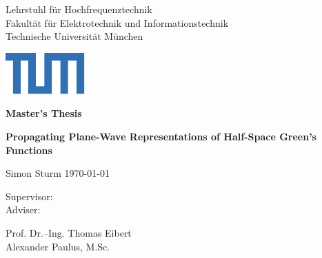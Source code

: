 \begin{titlepage}
	

	\newcommand{\UniversitaetLogoBreite}{19mm}
	\newcommand{\UniversitaetLogoHoehe}{1cm}

	\linespread{1}	
	\vspace*{-1cm}
    
	\setlength{\parindent}{0cm} 
	\begin{center}
		\begin{minipage}[l]{\textwidth-\UniversitaetLogoBreite}
			{ \footnotesize \color{TUMBlau}
				{\selectfont \small
					\textsf{Lehrstuhl für Hochfrequenztechnik\\
					Fakultät für Elektrotechnik und Informationstechnik\\
					Technische Universität München}\par}
			}
		\end{minipage}%
		\begin{minipage}[r]{\UniversitaetLogoBreite} %
			\includegraphics[width=\textwidth]{./titlepage/TUM_Logo_Web.pdf}
		\end{minipage}%
	\end{center}%
		
	\vspace{5cm}
	\Huge
	\textbf{Master's Thesis}
	\vspace{2cm}
	\LARGE
	\begin{flushleft}	
		\textbf{Propagating Plane-Wave Representations of Half-Space Green's Functions}
	\end{flushleft}
	\vspace{2cm}
	Simon Sturm  \qquad \qquad \today \\[3cm] 
	\large	
	\parbox[b][3cm][t]{2.2cm}{
		Supervisor: \\
	    Adviser: }
	\parbox[b][3cm][t]{6cm}{
		Prof. Dr.--Ing. Thomas Eibert\\
		Alexander Paulus, M.Sc.
		}				

\end{titlepage}	 
